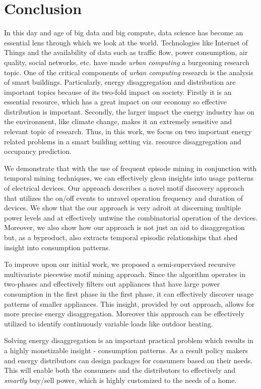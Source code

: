 \chapter{Conclusion}

In this day and age of big data and big compute, data science has become an essential lens through which we look at the world. Technologies like Internet of Things and the availability of data such as traffic flow, power consumption, air quality, social networks, etc. have made \emph{urban computing} a burgeoning research topic. One of the critical components of \emph{urban computing} research is the analysis of smart buildings. Particularly, energy disaggregation and distribution are important topics because of its two-fold impact on society. Firstly it is an essential resource, which has a great impact on our economy so effective distribution is important. Secondly, the larger impact the energy industry has on the environment, like climate change, makes it an extremely sensitive and relevant topic of research. Thus, in this work, we focus on two important energy related problems in a smart building setting viz. resource disaggregation and occupancy prediction. 

We demonstrate that with the use of frequent episode mining in conjunction with temporal mining techniques, we can effectively glean insights into usage patterns of electrical devices. Our approach describes a novel motif discovery approach that utilizes the on/off events to unravel operation frequency and duration of devices. We show that the our approach is very adroit at discerning multiple power levels and at effectively untwine the combinatorial operation of the devices. Moreover, we also show how our approach is not just an aid to disaggregation but, as a byproduct, also extracts temporal episodic relationships that shed insight into consumption patterns.

To improve upon our initial work, we proposed a semi-supervised recursive multivariate piecewise motif mining approach. Since the algorithm operates in two-phases and effectively filters out appliances that have large power consumption in the first phase in the first phase, it can effectively discover usage patterns of smaller appliances. This insight, provided by out approach, allows for more precise energy disaggregation. Moreover this approach can be effectively utilized to identify continuously variable loads like outdoor heating. 

Solving energy disaggregation is an important practical problem which results in a highly monetizable insight - consumption patterns. As a result policy makers and energy distributors can design packages for consumers based on their needs. This will enable both the consumers and the distributors to effectively and \emph{smartly} buy/sell power, which is highly customized to the needs of a home.

